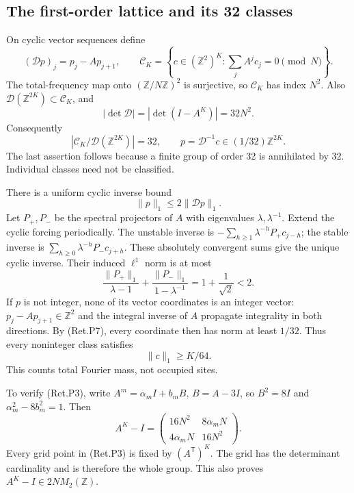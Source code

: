 \hypertarget{the-first-order-lattice-and-its-32-classes}{%
\subsection{The first-order lattice and its 32 classes}\label{the-first-order-lattice-and-its-32-classes}}

On cyclic vector sequences define
\[
 (\mathcal Dp)_j=p_j-Ap_{j+1},\qquad
 \mathcal C_K=\left\{c\in(\mathbb Z^2)^K:
                         \sum_jA^jc_j=0\pmod N\right\}.    \tag{Ret.P6}
\]
The total-frequency map onto \((\mathbb Z/N\mathbb Z)^2\) is surjective,
so \(\mathcal C_K\) has index \(N^2\).
Also \(\mathcal D(\mathbb Z^{2K})\subset\mathcal C_K\), and
\[
 |\det\mathcal D|=|\det(I-A^K)|=32N^2.
\]
Consequently
\[
 |\mathcal C_K/\mathcal D(\mathbb Z^{2K})|=32,\qquad
       p=\mathcal D^{-1}c\in(1/32)\mathbb Z^{2K}.            \tag{Ret.P7}
\]
The last assertion follows because a finite group of order 32 is
annihilated by 32. Individual classes need not be classified.

There is a uniform cyclic inverse bound
\[
                            \|p\|_1\le2\|\mathcal Dp\|_1.  \tag{Ret.P8}
\]
Let \(P_+,P_-\) be the spectral projectors of \(A\) with eigenvalues
\(\lambda,\lambda^{-1}\). Extend the cyclic forcing periodically.
The unstable inverse is \(-\sum_{h\ge1}\lambda^{-h}P_+c_{j-h}\);
the stable inverse is \(\sum_{h\ge0}\lambda^{-h}P_-c_{j+h}\).
These absolutely convergent sums give the unique cyclic inverse.
Their induced \(\ell^1\) norm is at most
\[
 \frac{\|P_+\|_1}{\lambda-1}
 +\frac{\|P_-\|_1}{1-\lambda^{-1}}
                      =1+\frac1{\sqrt2}<2.
\]
If \(p\) is not integer, none of its vector coordinates is an integer
vector: \(p_j-Ap_{j+1}\in\mathbb Z^2\) and the integral inverse of \(A\)
propagate integrality in both directions.
By (Ret.P7), every coordinate then has norm at least \(1/32\).
Thus every noninteger class satisfies
\[
                               \|c\|_1\ge K/64.            \tag{Ret.P9}
\]
This counts total Fourier mass, not occupied sites.

To verify (Ret.P3), write \(A^m=\alpha_mI+b_mB\), \(B=A-3I\),
so \(B^2=8I\) and \(\alpha_m^2-8b_m^2=1\). Then
\[
 A^K-I=
 \begin{pmatrix}
  16N^2&8\alpha_mN\\4\alpha_mN&16N^2
 \end{pmatrix}.
\]
Every grid point in (Ret.P3) is fixed by \((A^{\mathsf T})^K\).
The grid has the determinant cardinality and is therefore the whole group.
This also proves \(A^K-I\in2NM_2(\mathbb Z)\).

